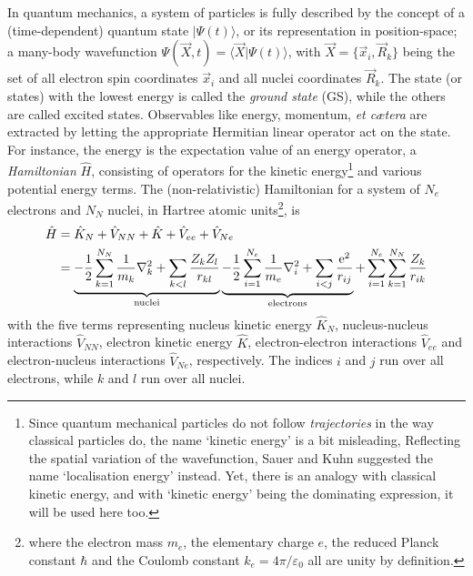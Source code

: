\documentclass[11pt,bibliography=totoc,index=totoc]{scrbook}   %
\newcommand{\comment}[1]{\hl{#1}}
\begin{document}

In quantum mechanics, a system of particles is fully described by the concept of a (time-dependent) quantum state $|\Psi(t)\rangle$, 
or its representation in position-space; a many-body wavefunction $\Psi(\vec{X},t)=\langle\vec{X}|\Psi(t)\rangle$, with $\vec{X}=\{\vec{x}_i,\vec{R}_k\}$ being the set of all electron spin coordinates $\vec{x}_i$ and all nuclei coordinates $\vec{R}_k$.
The state (or states) with the lowest energy is called the \emph{ground state} (GS), while the others are called excited states. 
Observables like energy, momentum, \textit{et cætera} are extracted by letting the appropriate Hermitian linear operator act on the state. 
For instance, the energy is the expectation value of an energy operator, a \emph{Hamiltonian} $\hat{H}$, 
consisting of operators for the kinetic energy\footnote{Since quantum mechanical particles do not follow \emph{trajectories} in the way classical particles do, the name `kinetic energy' is a bit misleading, Reflecting the spatial variation of the wavefunction, Sauer and Kuhn suggested the name `localisation energy' instead\cite{Sauer:1982}. Yet, there is an analogy with classical kinetic energy, and with `kinetic energy' being the dominating expression, it will be used here too.} and various potential energy terms.
The (non-relativistic) Hamiltonian for a system of $N_e$ electrons and $N_N$ nuclei, in Hartree atomic units\footnote{
where the electron mass $m_e$, the elementary charge $e$, the reduced Planck constant $\hbar$ and the Coulomb constant $k_e=4\pi/\varepsilon_0$ all are unity by definition.
}, is
\begin{align}
  \hat{H} &= \hat{K}_N + \hat{V}_{NN} + \hat{K} + \hat{V}_{ee} + \hat{V}_{Ne}\\
    &= \underbrace{
        - \frac{1}{2}\sum_{k=1}^{N_N} \frac{1}{m_k}\nabla_k^2 
        + \sum_{k<l}\frac{Z_kZ_l}{r_{kl}}
		}_{\text{nuclei}}
  \underbrace{
      -\frac{1}{2}\sum_{i=1}^{N_e}\frac{1}{m_e}\nabla_i^2
	+ \sum_{i<j}\frac{\mathrm{e}^2}{r_{ij}}
	}_{\text{electrons}}
    + \sum_{i=1}^{N_e}\sum_{k=1}^{N_N} \frac{Z_k}{r_{ik}}
  \label{eq:mol-hamiltonian}
\end{align}
with the five terms representing nucleus kinetic energy $\hat{K}_N$, nucleus-nucleus interactions $\hat{V}_{NN}$, electron kinetic energy $\hat{K}$, electron-electron interactions $\hat{V}_{ee}$ and electron-nucleus interactions $\hat{V}_{Ne}$, respectively.
The indices $i$ and $j$ run over all electrons, while $k$ and $l$ run over all nuclei. 
\end{document}
